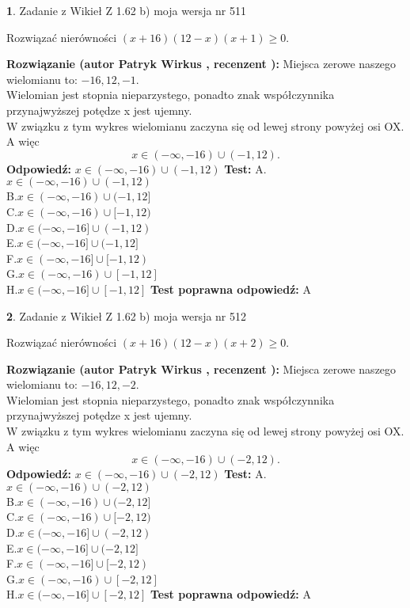 \documentclass[12pt, a4paper]{article}
\theoremstyle{definition} %
\newtheorem{zad}{}
\newcommand{\zadStart}[1]{\begin{zad}#1\newline}
\newcommand{\zadStop}{\end{zad}}
\newcommand{\rozwStart}[2]{\noindent \textbf{Rozwiązanie (autor #1 , recenzent #2): }\newline}
\newcommand{\rozwStop}{\newline}
\newcommand{\odpStart}{\noindent \textbf{Odpowiedź:}\newline}
\newcommand{\odpStop}{\newline}
\newcommand{\testStart}{\noindent \textbf{Test:}\newline}
\newcommand{\testStop}{\newline}
\newcommand{\kluczStart}{\noindent \textbf{Test poprawna odpowiedź:}\newline}
\newcommand{\kluczStop}{\newline}
\begin{document}
\zadStart{Zadanie z Wikieł Z 1.62 b) moja wersja nr 511}

Rozwiązać nierówności $(x+16)(12-x)(x+1)\ge0$.
\zadStop
\rozwStart{Patryk Wirkus}{}
Miejsca zerowe naszego wielomianu to: $-16, 12, -1$.\\
Wielomian jest stopnia nieparzystego, ponadto znak współczynnika przy\linebreak najwyższej potędze x jest ujemny.\\ W związku z tym wykres wielomianu zaczyna się od lewej strony powyżej osi OX. A więc $$x \in (-\infty,-16) \cup (-1,12).$$
\rozwStop
\odpStart
$x \in (-\infty,-16) \cup (-1,12)$
\odpStop
\testStart
A.$x \in (-\infty,-16) \cup (-1,12)$\\
B.$x \in (-\infty,-16) \cup (-1,12]$\\
C.$x \in (-\infty,-16) \cup [-1,12)$\\
D.$x \in (-\infty,-16] \cup (-1,12)$\\
E.$x \in (-\infty,-16] \cup (-1,12]$\\
F.$x \in (-\infty,-16] \cup [-1,12)$\\
G.$x \in (-\infty,-16) \cup [-1,12]$\\
H.$x \in (-\infty,-16] \cup [-1,12]$
\testStop
\kluczStart
A
\kluczStop



\zadStart{Zadanie z Wikieł Z 1.62 b) moja wersja nr 512}

Rozwiązać nierówności $(x+16)(12-x)(x+2)\ge0$.
\zadStop
\rozwStart{Patryk Wirkus}{}
Miejsca zerowe naszego wielomianu to: $-16, 12, -2$.\\
Wielomian jest stopnia nieparzystego, ponadto znak współczynnika przy\linebreak najwyższej potędze x jest ujemny.\\ W związku z tym wykres wielomianu zaczyna się od lewej strony powyżej osi OX. A więc $$x \in (-\infty,-16) \cup (-2,12).$$
\rozwStop
\odpStart
$x \in (-\infty,-16) \cup (-2,12)$
\odpStop
\testStart
A.$x \in (-\infty,-16) \cup (-2,12)$\\
B.$x \in (-\infty,-16) \cup (-2,12]$\\
C.$x \in (-\infty,-16) \cup [-2,12)$\\
D.$x \in (-\infty,-16] \cup (-2,12)$\\
E.$x \in (-\infty,-16] \cup (-2,12]$\\
F.$x \in (-\infty,-16] \cup [-2,12)$\\
G.$x \in (-\infty,-16) \cup [-2,12]$\\
H.$x \in (-\infty,-16] \cup [-2,12]$
\testStop
\kluczStart
A
\kluczStop
\end{document}
